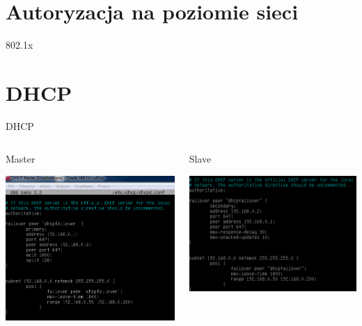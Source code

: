 \documentclass[presentation]{beamer}
\begin{document}
\section{Autoryzacja na poziomie sieci}
\label{sec:org46ca18f}
\begin{frame}[label={sec:org7b26984}]{802.1x}
\end{frame}
\section{DHCP}
\label{sec:orgeec1318}
\begin{frame}[label={sec:org5c39ba0}]{DHCP}
\begin{columns}
\begin{column}{0.55\columnwidth}
\begin{block}{Master}
\begin{center}
\includegraphics[width=.9\linewidth]{./data/dhcp/5_master.png}
\end{center}
\end{block}
\end{column}
\begin{column}{0.55\columnwidth}
\begin{block}{Slave}
\begin{center}
\includegraphics[width=.9\linewidth]{./data/dhcp/5_slave.png}
\end{center}
\end{block}
\end{column}
\end{columns}


\end{frame}
\end{document}
